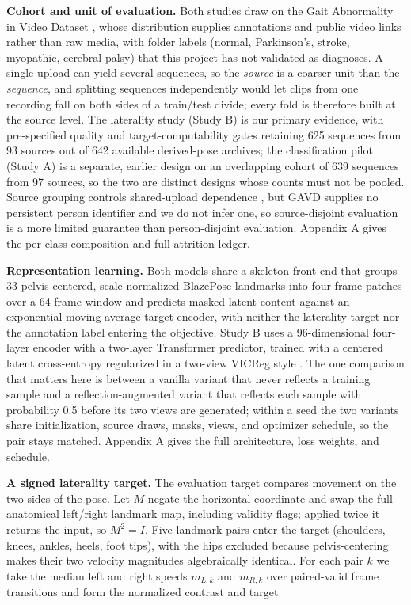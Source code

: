 \documentclass{article}
\begin{document}
\textbf{Cohort and unit of evaluation.} Both studies draw on the Gait
Abnormality in Video Dataset \citep{ranjan2025gavd, gavdRepo2026}, whose
distribution supplies annotations and public video links rather than raw
media, with folder labels (normal, Parkinson's, stroke, myopathic,
cerebral palsy) that this project has not validated as diagnoses. A
single upload can yield several sequences, so the \emph{source} is a
coarser unit than the \emph{sequence}, and splitting sequences
independently would let clips from one recording fall on both sides of a
train/test divide; every fold is therefore built at the source level.
The laterality study (Study B) is our primary evidence, with
pre-specified quality and target-computability gates retaining 625
sequences from 93 sources out of 642 available derived-pose archives;
the classification pilot (Study A) is a separate, earlier design on an
overlapping cohort of 639 sequences from 97 sources, so the two are
distinct designs whose counts must not be pooled. Source grouping
controls shared-upload dependence \citep{roberts2017crossvalidation},
but GAVD supplies no persistent person identifier and we do not infer
one, so source-disjoint evaluation is a more limited guarantee than
person-disjoint evaluation. Appendix A gives the per-class composition
and full attrition ledger.

\textbf{Representation learning.} Both models share a skeleton front end
that groups 33 pelvis-centered, scale-normalized BlazePose landmarks
into four-frame patches over a 64-frame window and predicts masked
latent content against an exponential-moving-average target encoder,
with neither the laterality target nor the annotation label entering the
objective. Study B uses a 96-dimensional four-layer encoder with a
two-layer Transformer predictor, trained with a centered latent
cross-entropy regularized in a two-view VICReg style
\citep{bardes2022vicreg}. The one comparison that matters here is
between a vanilla variant that never reflects a training sample and a
reflection-augmented variant that reflects each sample with probability
0.5 before its two views are generated; within a seed the two variants
share initialization, source draws, masks, views, and optimizer
schedule, so the pair stays matched. Appendix A gives the full
architecture, loss weights, and schedule.

\textbf{A signed laterality target.} The evaluation target compares
movement on the two sides of the pose. Let \(M\) negate the horizontal
coordinate and swap the full anatomical left/right landmark map,
including validity flags; applied twice it returns the input, so
\(M^2 = I\). Five landmark pairs enter the target (shoulders, knees,
ankles, heels, foot tips), with the hips excluded because
pelvis-centering makes their two velocity magnitudes algebraically
identical. For each pair \(k\) we take the median left and right speeds
\(m_{L,k}\) and \(m_{R,k}\) over paired-valid frame transitions and form
the normalized contrast and target
\end{document}

